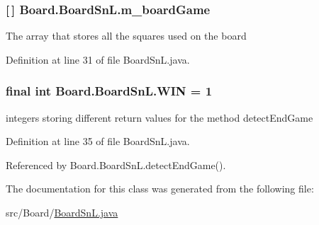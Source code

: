 \subsubsection[{m\+\_\+board\+Game}]{ \mbox{[}$\,$\mbox{]} Board.\+Board\+Sn\+L.\+m\+\_\+board\+Game\hspace{0.3cm}{\ttfamily [private]}}\label{class_board_1_1_board_sn_l_a98423adeb63e796de2d496689b4ce8e1}
The array that stores all the squares used on the board 

Definition at line 31 of file Board\+Sn\+L.\+java.

\hypertarget{class_board_1_1_board_sn_l_a9f3b27889e40b337a28438224a5fab4b}{}
\subsubsection[{W\+I\+N}]{\setlength{\rightskip}{0pt plus 5cm}final int Board.\+Board\+Sn\+L.\+W\+I\+N = 1\hspace{0.3cm}{\ttfamily [private]}}\label{class_board_1_1_board_sn_l_a9f3b27889e40b337a28438224a5fab4b}
integers storing different return values for the method detect\+End\+Game 

Definition at line 35 of file Board\+Sn\+L.\+java.



Referenced by Board.\+Board\+Sn\+L.\+detect\+End\+Game().



The documentation for this class was generated from the following file\+:\begin{DoxyCompactItemize}
\item 
src/\+Board/\hyperlink{_board_sn_l_8java}{Board\+Sn\+L.\+java}\end{DoxyCompactItemize}

